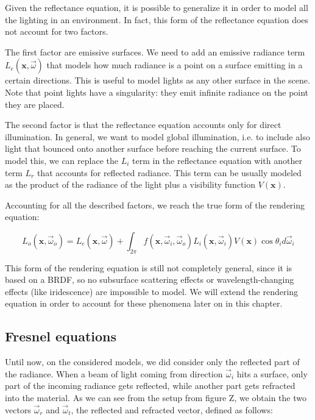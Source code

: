 Given the reflectance equation, it is possible to generalize it in order to model all the lighting in an environment. In fact, this form of the reflectance equation does not account for two factors. 

The first factor are emissive surfaces. We need to add an emissive radiance term $L_e(\mathbf{x}, \vec{\omega})$ that models how much radiance is a point on a surface emitting in a certain directions. This is useful to model lights as any other surface in the scene. Note that point lights have a singularity: they emit infinite radiance on the point they are placed.

The second factor is that the reflectance equation accounts only for direct illumination. In general, we want to model global illumination, i.e. to include also light that bounced onto another surface before reaching the current surface. To model this, we can replace the $L_i$ term in the reflectance equation with another term $L_r$ that accounts for reflected radiance. This term can be usually modeled as the product of the radiance of the light plus a visibility function $V(\mathbf{x})$.

Accounting for all the described factors, we reach the true form of the rendering equation:

$$
L_o(\mathbf{x}, \vec{\omega}_o) = L_e(\mathbf{x}, \vec{\omega}) + \int_{2\pi} f(\mathbf{x}, \vec{\omega}_i, \vec{\omega}_o) L_i(\mathbf{x}, \vec{\omega}_i) V(\mathbf{x}) \cos\theta_i d\vec{\omega}_i
$$

This form of the rendering equation is still not completely general, since it is based on a BRDF, so no subsurface scattering effects or wavelength-changing effects (like iridescence) are impossible to model. We will extend the rendering equation in order to account for these phenomena later on in this chapter.

\subsection{Fresnel equations}

Until now, on the considered models, we did consider only the reflected part of the radiance. When a beam of light coming from direction $\vec{\omega}_i$ hits a surface, only part of the incoming radiance gets reflected, while another part gets refracted into the material. As we can see from the setup from figure Z, we obtain the two vectors $\vec{\omega}_r$ and $\vec{\omega}_t$, the reflected and refracted vector, defined as follows:

